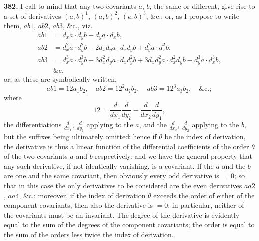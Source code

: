 \documentclass[11pt,a4paper]{book}
\begin{document}
\noindent\textbf{382.} I call to mind that any two covariants $a$, $b$, the same or different, give rise to a set of derivatives $(a, b)^1$, $(a, b)^2$, $(a, b)^3$, \&c., or, as I propose to write them, $ab1$, $ab2$, $ab3$, \&c., viz.
\begin{align*}
ab1 &= d_x a \cdot d_y b - d_y a \cdot d_x b, \\
ab2 &= d_x^2 a \cdot d_y^2 b - 2d_x d_y a \cdot d_x d_y b + d_y^2 a \cdot d_x^2 b, \\
ab3 &= d_x^3 a \cdot d_y^3 b - 3d_x^2 d_y a \cdot d_x d_y^2 b + 3d_x d_y^2 a \cdot d_x^2 d_y b - d_y^3 a \cdot d_x^3 b, \\
&\text{\&c.}
\end{align*}
or, as these are symbolically written,
\[
ab1 = 12a_1 b_2,\quad ab2 = 12^2 a_2 b_2,\quad ab3 = 12^3 a_3 b_2,\quad \text{\&c.};
\]
where
\[
12 = \frac{d}{dx_1} \frac{d}{dy_2} - \frac{d}{dx_2} \frac{d}{dy_1},
\]
the differentiations $\frac{d}{dx_1}$, $\frac{d}{dy_1}$ applying to the $a$, and the $\frac{d}{dx_2}$, $\frac{d}{dy_2}$ applying to the $b$, but the suffixes being ultimately omitted: hence if $\theta$ be the index of derivation, the derivative is thus a linear function of the differential coefficients of the order $\theta$ of the two covariants $a$ and $b$ respectively: and we have the general property that any such derivative, if not identically vanishing, is a covariant. If the $a$ and the $b$ are one and the same covariant, then obviously every odd derivative is $=0$; so that in this case the only derivatives to be considered are the even derivatives $aa2$, $aa4$, \&c.: moreover, if the index of derivation $\theta$ exceeds the order of either of the component covariants, then also the derivative is $=0$: in particular, neither of the covariants must be an invariant. The degree of the derivative is evidently equal to the sum of the degrees of the component covariants; the order is equal to the sum of the orders less twice the index of derivation.

\medskip
\end{document}
